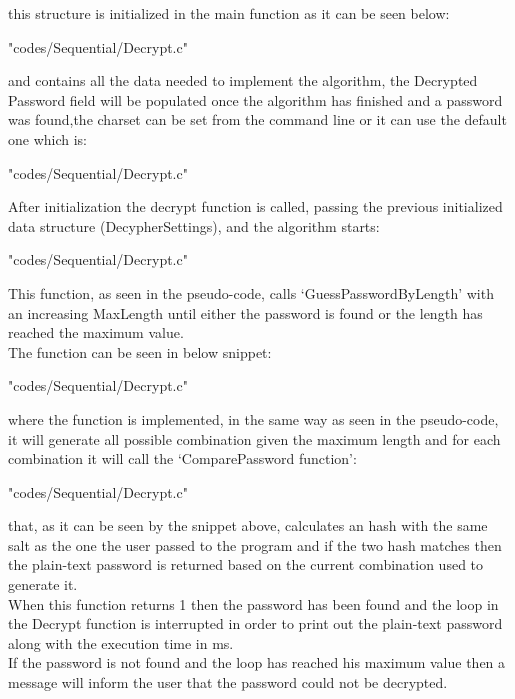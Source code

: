 \documentclass[10pt,twocolumn,letterpaper]{article}
\begin{document}
this structure is initialized in the main function as it can be seen below:
\begin{lstinputlisting}[language=C,style=CSnippetStyle,caption=DecypherSettingsInit Function,firstline=93,lastline=113 ]{
	"codes/Sequential/Decrypt.c"}
\end{lstinputlisting}
and contains all the data needed to implement the algorithm, the Decrypted Password field will be populated once the algorithm has 
finished and a password was found,the charset can be set from the command line or it can use the default one which is:
\begin{lstinputlisting}[language=C,style=CSnippetStyle,caption=Default Charset,firstline=3,lastline=3]{
	"codes/Sequential/Decrypt.c"}
\end{lstinputlisting}
After initialization the decrypt function is called, passing the previous initialized data structure (DecypherSettings), and the 
algorithm starts:
\begin{lstinputlisting}[language=C,style=CSnippetStyle,caption=Decrypt Function,firstline=71,lastline=91]{
	"codes/Sequential/Decrypt.c"}
\end{lstinputlisting}
This function, as seen in the pseudo-code, calls `GuessPasswordByLength' with an increasing MaxLength until either the password is found
or the length has reached the maximum value.\\
The function can be seen in below snippet:\\
\begin{lstinputlisting}[language=C,style=CSnippetStyle,caption=GuessPasswordByLength Function,firstline=27,lastline=69]{
	"codes/Sequential/Decrypt.c"}
\end{lstinputlisting}
where the function is implemented, in the same way as seen in the pseudo-code, it will generate all possible combination given the 
maximum length and for each combination it will call the `ComparePassword function':
\begin{lstinputlisting}[language=C,style=CSnippetStyle,caption=ComparePassword Function,firstline=20,lastline=25]{
	"codes/Sequential/Decrypt.c"}
\end{lstinputlisting}
that, as it can be seen by the snippet above, calculates an hash with the same salt as the one the user passed to the program and if
the two hash matches then the plain-text password is returned based on the current combination used to generate it.\\
When this function returns 1 then the password has been found and the loop in the Decrypt function is interrupted in order to print out 
the plain-text password along with the execution time in ms.\\
If the password is not found and the loop has reached his maximum value then a message will inform the user that the password could not
be decrypted.\\
\end{document}
